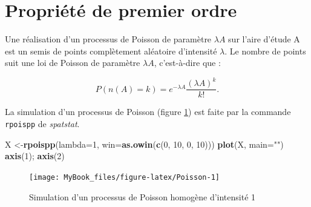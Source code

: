 \documentclass[
  11pt,
  french,
  A4paper,
  extrafontsizes,onecolumn,openright
  ]{memoir}
\newenvironment{Shaded}{\begin{snugshade}}{\end{snugshade}}
\newcommand{\KeywordTok}[1]{\textcolor[rgb]{0.13,0.29,0.53}{\textbf{#1}}}
\newcommand{\DataTypeTok}[1]{\textcolor[rgb]{0.13,0.29,0.53}{#1}}
\newcommand{\DecValTok}[1]{\textcolor[rgb]{0.00,0.00,0.81}{#1}}
\newcommand{\StringTok}[1]{\textcolor[rgb]{0.31,0.60,0.02}{#1}}
\newcommand{\NormalTok}[1]{#1}
\theoremstyle{definition}
\theoremstyle{definition}
\theoremstyle{definition}
\theoremstyle{remark}
\begin{document}
\section{Propriété de premier ordre}\label{propriete-de-premier-ordre-1}

Une réalisation d'un processus de Poisson de paramètre \(\lambda A\) sur
l'aire d'étude A est un semis de points complètement aléatoire
d'intensité \(\lambda\). Le nombre de points suit une loi de Poisson de
paramètre \(\lambda A\), c'est-à-dire que :

\begin{equation}
  P(n(A)=k) = e^{-\lambda A} \frac{(\lambda A)^k}{k!}.
  \label{eq:Poisson}
\end{equation}

La simulation d'un processus de Poisson (figure \ref{fig:Poisson}) est
faite par la commande \texttt{rpoispp} de \emph{spatstat}.

\begin{Shaded}
\begin{Highlighting}[]
\NormalTok{X <-}\KeywordTok{rpoispp}\NormalTok{(}\DataTypeTok{lambda=}\DecValTok{1}\NormalTok{, }\DataTypeTok{win=}\KeywordTok{as.owin}\NormalTok{(}\KeywordTok{c}\NormalTok{(}\DecValTok{0}\NormalTok{, }\DecValTok{10}\NormalTok{, }\DecValTok{0}\NormalTok{, }\DecValTok{10}\NormalTok{)))}
\KeywordTok{plot}\NormalTok{(X, }\DataTypeTok{main=}\StringTok{""}\NormalTok{)}
\KeywordTok{axis}\NormalTok{(}\DecValTok{1}\NormalTok{); }\KeywordTok{axis}\NormalTok{(}\DecValTok{2}\NormalTok{)}
\end{Highlighting}
\end{Shaded}

\begin{figure}

{\centering \texttt{[image: MyBook\_files/figure-latex/Poisson-1]} 

}

\caption{Simulation d’un processus de Poisson homogène d’intensité 1}\label{fig:Poisson}
\end{figure}



\backmatter
\SmallMargins

%
\printbibliography






\end{document}
